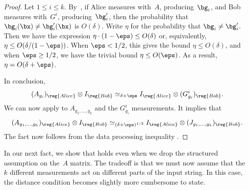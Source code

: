 \begin{proof}
Let $1 \leq i \leq k$.
By~,
if Alice measures with~$A$, producing~$\bg_i$, and Bob measures with~$G^i$, producing~$\bg_i'$,
then the probability that $\bg_i(\bx) \neq \bg_i'(\bx)$ is $O(\delta)$.
Write $\eta$ for the probability that $\bg_i \neq \bg_i'$.
Then we have the expression $\eta \cdot (1-\eps) \leq O(\delta)$ or, equivalently, $\eta \leq O(\delta/(1-\eps))$.
When $\eps < 1/2$, this gives the bound $\eta \leq O(\delta)$, and when $\eps \geq 1/2$, we have the trivial bound $\eta \leq O(\eps)$.
As a result, $\eta = O(\delta + \eps)$.

In conclusion,
\begin{equation*}
(A_{g_i})_{\reg{Alice}} \otimes I_{\reg{Bob}} \simeq_{\delta + \eps} I_{\reg{Alice}} \otimes (G^i_{g_i})_{\reg{Bob}}.
\end{equation*}
We can now apply  to $A_{g_1, \ldots, g_k}$ and the $G^i_{g_i}$ measurements.
It implies that
\begin{equation*}
(A_{g_1, \ldots, g_k})_{\reg{Alice}} \otimes I_{\reg{Bob}} \simeq_{(\delta+\eps)^{1/2}} I_{\reg{Alice}} \otimes (J_{g_1, \ldots, g_k})_{\reg{Bob}}.
\end{equation*}
The fact now follows from the data processing inequality .
\end{proof}

In our next fact, we show that  holds even when we drop the structured assumption on the~$A$ matrix.
The tradeoff is that we must now assume that the~$k$ different measurements act on different parts of the input string.
In this case, the distance condition becomes slightly more cumbersome to state.

